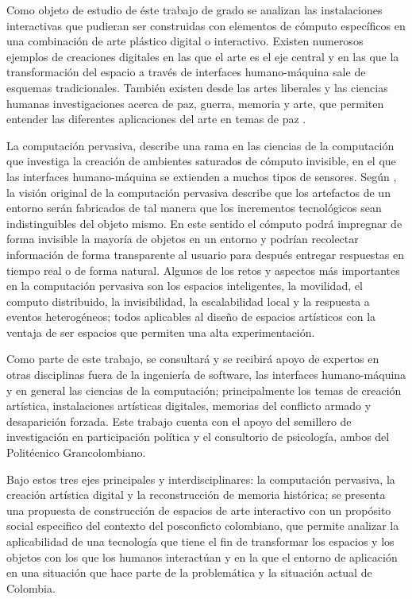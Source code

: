 Como objeto de estudio de éste trabajo de grado se analizan las instalaciones interactivas que pudieran ser construidas con elementos de cómputo específicos en una combinación de arte plástico digital o interactivo. Existen numerosos ejemplos
\cite{RN35}\cite{RN25}\cite{RN34}\cite{RN38}\cite{RN31}\cite{RN29}\cite{RN40}\cite{RN37}
de creaciones digitales en las que el arte es el eje central y en las que la transformación del espacio a través de interfaces humano-máquina sale de esquemas tradicionales. También existen desde las artes liberales y las ciencias humanas investigaciones acerca de paz, guerra, memoria y arte, que permiten entender las diferentes aplicaciones del arte en temas de paz \cite{Jimenez201672}\cite{SotoAguilar201591}\cite{EstripeautBourjac2013154}. 

La computación pervasiva, describe una rama en las ciencias de la computación que investiga la creación de ambientes saturados de cómputo invisible, en el que las interfaces humano-máquina se extienden a muchos tipos de sensores. Según \cite{RN1}, la visión original de la computación pervasiva describe que los artefactos de un entorno serán fabricados de tal manera que los incrementos tecnológicos sean indistinguibles del objeto mismo. En este sentido el cómputo podrá impregnar de forma invisible la mayoría de objetos en un entorno y podrían recolectar información de forma transparente al usuario para después entregar respuestas en tiempo real o de forma natural.  Algunos de los retos y aspectos más importantes en la computación pervasiva son los espacios inteligentes, la movilidad, el computo distribuido, la invisibilidad, la escalabilidad local y la respuesta a eventos heterogéneos; todos aplicables al diseño de espacios artísticos con la ventaja de ser espacios que permiten una alta experimentación.

Como parte de este trabajo, se consultará y se recibirá apoyo de expertos en otras disciplinas fuera de la ingeniería de software, las interfaces humano-máquina y en general las ciencias de la computación; principalmente los temas de creación artística, instalaciones artísticas digitales, memorias del conflicto armado y desaparición forzada. Este trabajo cuenta con el apoyo del semillero de investigación en participación política y el consultorio de psicología, ambos del Politécnico Grancolombiano.

Bajo estos tres ejes principales y interdisciplinares: la computación pervasiva, la creación artística digital y la reconstrucción de memoria histórica; se presenta una propuesta de construcción de espacios de arte interactivo con un propósito social especifico del contexto del posconficto colombiano, que permite analizar la aplicabilidad de una tecnología que tiene el fin de transformar los espacios y los objetos con los que los humanos interactúan y en la que el entorno de aplicación en una situación que hace parte de la problemática y la situación actual de Colombia.


